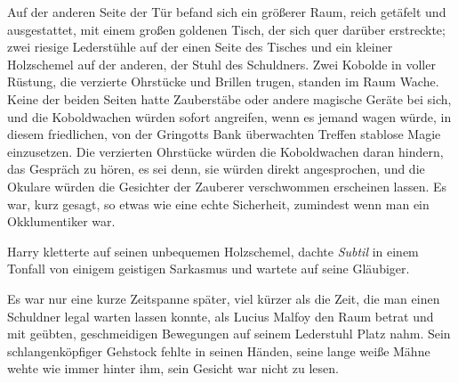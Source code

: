 Auf der anderen Seite der Tür befand sich ein größerer Raum, reich getäfelt und ausgestattet, mit einem großen goldenen Tisch, der sich quer darüber erstreckte; zwei riesige Lederstühle auf der einen Seite des Tisches und ein kleiner Holzschemel auf der anderen, der Stuhl des Schuldners. Zwei Kobolde in voller Rüstung, die verzierte Ohrstücke und Brillen trugen, standen im Raum Wache. Keine der beiden Seiten hatte Zauberstäbe oder andere magische Geräte bei sich, und die Koboldwachen würden sofort angreifen, wenn es jemand wagen würde, in diesem friedlichen, von der Gringotts Bank überwachten Treffen stablose Magie einzusetzen. Die verzierten Ohrstücke würden die Koboldwachen daran hindern, das Gespräch zu hören, es sei denn, sie würden direkt angesprochen, und die Okulare würden die Gesichter der Zauberer verschwommen erscheinen lassen. Es war, kurz gesagt, so etwas wie eine echte Sicherheit, zumindest wenn man ein Okklumentiker war.

Harry kletterte auf seinen unbequemen Holzschemel, dachte \emph{Subtil} in einem Tonfall von einigem geistigen Sarkasmus und wartete auf seine Gläubiger.

Es war nur eine kurze Zeitspanne später, viel kürzer als die Zeit, die man einen Schuldner legal warten lassen konnte, als Lucius Malfoy den Raum betrat und mit geübten, geschmeidigen Bewegungen auf seinem Lederstuhl Platz nahm. Sein schlangenköpfiger Gehstock fehlte in seinen Händen, seine lange weiße Mähne wehte wie immer hinter ihm, sein Gesicht war nicht zu lesen.

